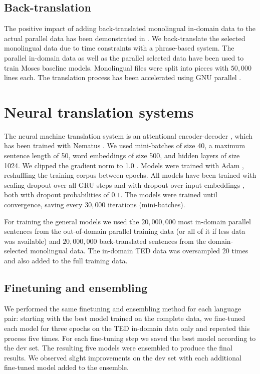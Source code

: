 \documentclass[11pt]{article}
\begin{document}
\subsection{Back-translation}

The positive impact of adding back-translated monolingual in-domain data to the actual parallel data has been demonstrated in \cite{DBLP:journals/corr/SennrichHB15a}. We back-translate the selected monolingual data due to time constraints with a phrase-based system. The parallel in-domain data as well as the parallel selected data have been used to train Moses baseline models. Monolingual files were split into pieces with $50,000$ lines each. The translation process has been accelerated using GNU parallel \cite{Tange2011a}. 

\section{Neural translation systems}

The neural machine translation system is an attentional encoder-decoder \cite{DBLP:journals/corr/BahdanauCB14}, which has been trained with Nematus  \cite{DBLP:conf/wmt/SennrichHB16}.
We used mini-batches of size 40, a maximum sentence length of 50, word embeddings of size 500, and hidden layers of size 1024.
We clipped the gradient norm to 1.0 \cite{DBLP:conf/icml/PascanuMB13}.
Models were trained with Adam \cite{DBLP:journals/corr/KingmaB14}, reshuffling the training corpus between epochs. All models have been trained with scaling dropout over all GRU steps and with dropout over input embeddings \cite{DBLP:conf/wmt/SennrichHB16}, both with dropout probabilities of $0.1$.
The models were trained until convergence, saving every $30,000$ iterations (mini-batches). 

For training the general models we used the $20,000,000$ most in-domain parallel sentences from the out-of-domain parallel training data (or all of it if less data was available) and $20,000,000$ back-translated sentences from the domain-selected monolingual data. The in-domain TED data was oversampled $20$ times and also added to the full training data. 

\subsection{Finetuning and ensembling}

We performed the same finetuning and ensembling method for each language pair: starting with the best model trained on the complete data, we fine-tuned each model for three epochs on the TED in-domain data only and repeated this process five times. For each fine-tuning step we saved the best model according to the dev set. The resulting five models were ensembled to produce the final results. We observed slight improvements on the dev set with each additional fine-tuned model added to the ensemble. 
\end{document}
